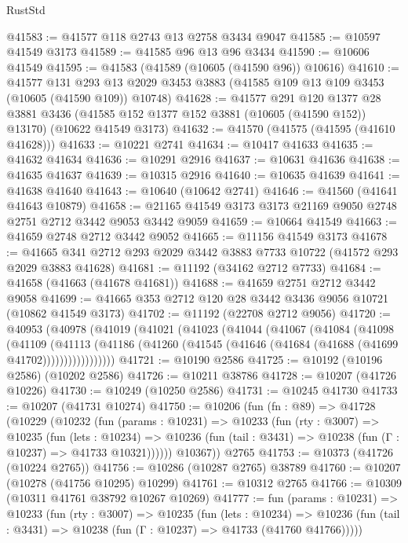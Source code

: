 \begin{lexlean}{RustStd}
\begin{coremodule}
@41583 := @41577 @118 @2743 @13 @2758 @3434 @9047
@41585 := @10597 @41549 @3173
@41589 := @41585 @96 @13 @96 @3434
@41590 := @10606 @41549
@41595 := @41583 (@41589 (@10605 (@41590 @96)) @10616)
@41610 := @41577
    @131
    @293
    @13
    @2029
    @3453
    @3883
    (@41585 @109 @13 @109 @3453 (@10605 (@41590 @109)) @10748)
@41628 := @41577
    @291
    @120
    @1377
    @28
    @3881
    @3436
    (@41585 @152 @1377 @152 @3881 (@10605 (@41590 @152)) @13170)
    (@10622 @41549 @3173)
@41632 := @41570 (@41575 (@41595 (@41610 @41628)))
@41633 := @10221 @2741
@41634 := @10417 @41633
@41635 := @41632 @41634
@41636 := @10291 @2916
@41637 := @10631 @41636
@41638 := @41635 @41637
@41639 := @10315 @2916
@41640 := @10635 @41639
@41641 := @41638 @41640
@41643 := @10640 (@10642 @2741)
@41646 := @41560 (@41641 @41643 @10879)
@41658 := @21165 @41549 @3173 @3173 @21169 @9050 @2748 @2751 @2712 @3442 @9053 @3442 @9059
@41659 := @10664 @41549
@41663 := @41659 @2748 @2712 @3442 @9052
@41665 := @11156 @41549 @3173
@41678 := @41665 @341 @2712 @293 @2029 @3442 @3883 @7733 @10722 (@41572 @293 @2029 @3883 @41628)
@41681 := @11192 (@34162 @2712 @7733)
@41684 := @41658 (@41663 (@41678 @41681))
@41688 := @41659 @2751 @2712 @3442 @9058
@41699 := @41665 @353 @2712 @120 @28 @3442 @3436 @9056 @10721 (@10862 @41549 @3173)
@41702 := @11192 (@22708 @2712 @9056)
@41720 := @40953
    (@40978
      (@41019
        (@41021
          (@41023
            (@41044
              (@41067
                (@41084
                  (@41098
                    (@41109
                      (@41113
                        (@41186
                          (@41260 (@41545 (@41646 (@41684 (@41688 (@41699 @41702)))))))))))))))))
@41721 := @10190 @2586
@41725 := @10192 (@10196 @2586) (@10202 @2586)
@41726 := @10211 @38786
@41728 := @10207 (@41726 @10226)
@41730 := @10249 (@10250 @2586)
@41731 := @10245 @41730
@41733 := @10207 (@41731 @10274)
@41750 := @10206
    (fun (fn : @89) =>
    @41728
      (@10229
        (@10232
          (fun (params : @10231) =>
          @10233
            (fun (rty : @3007) =>
            @10235
              (fun (lets : @10234) =>
              @10236 (fun (tail : @3431) => @10238 (fun (Γ : @10237) => @41733 @10321))))))
        @10367))
    @2765
@41753 := @10373 (@41726 (@10224 @2765))
@41756 := @10286 (@10287 @2765) @38789
@41760 := @10207 (@10278 (@41756 @10295) @10299)
@41761 := @10312 @2765
@41766 := @10309 (@10311 @41761 @38792 @10267 @10269)
@41777 := fun (params : @10231) =>
  @10233
    (fun (rty : @3007) =>
    @10235
      (fun (lets : @10234) =>
      @10236 (fun (tail : @3431) => @10238 (fun (Γ : @10237) => @41733 (@41760 @41766)))))

\end{coremodule}
\end{lexlean}
